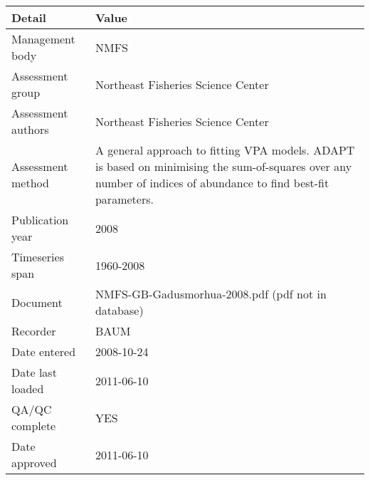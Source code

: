 \begin{table}[htb]
\centering
\begin{tabular}{lp{7cm}}
\toprule
Detail & Value \\
\midrule
Management body    & NMFS                                                                                                                                                           \\
Assessment group   & Northeast Fisheries Science Center                                                                                                                             \\
Assessment authors & Northeast Fisheries Science Center                                                                                                                             \\
Assessment method  & A general approach to fitting VPA models. ADAPT is based on minimising the sum-of-squares over any number of indices of abundance to find best-fit parameters. \\
Publication year   & 2008                                                                                                                                                           \\
Timeseries span    & 1960-2008                                                                                                                                                      \\
Document           & NMFS-GB-Gadusmorhua-2008.pdf (pdf not in database)                                                                                                             \\
Recorder           & BAUM                                                                                                                                                           \\
Date entered       & 2008-10-24                                                                                                                                                     \\
Date last loaded   & 2011-06-10                                                                                                                                                     \\
QA/QC complete     & YES                                                                                                                                                            \\
Date approved      & 2011-06-10                                                                                                                                                     \\
\bottomrule
\end{tabular}
\label{tab:assessdet}
\end{table}
